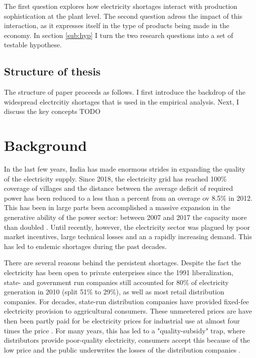 \documentclass[11pt]{article}
\begin{document}
The first question explores how electricity shortages interact with production sophistication at the plant level. The second question adress the impact of this interaction, as it expresses itself in the type of products being made in the economy. In section \ref{sub:hyp} I turn the two research questions into a set of testable hypothese.

\subsection{Structure of thesis}%
\label{sub:structure_of_thesis}
The structure of paper proceeds as follows. I first introduce the backdrop of the widespread electrcitiy shortages that is used in the empirical analysis. Next, I discuss the key concepts TODO 



\newpage
\section{Background}%
\label{sec:background}

In the last few years, India has made enormous strides in expanding the quality of the electricity supply. Since 2018, the electricity grid has reached 100\% coverage of villages and the distance between the average deficit of required power has been reduced to a less than a percent from an overage ov 8.5\% in 2012. This has been in large parts been accomplished a massive expansion in the generative ability of the power sector: between 2007 and 2017 the capacity more than doubled \citep{zhang_dark_2018}. Until recently, however, the electricity sector was plagued by poor market incentives, large technical losses and an a rapidly increasing demand. This has led to endemic shortages during the past decades.

There are several reasons behind the persistent shortages. Despite the fact the electricity has been open to private enterprises since the 1991 liberalization, state- and government run companies still accounted for 80\% of electricity generation in 2010 (split 51\% to 29\%), as well as most retail distribution companies. For decades, state-run distribution companies have provided fixed-fee electricity provision to aggricultural consumers. These unmeetered prices are have then been partly paid for be electricity prices for industrial use at almost four times the price \citep{allcott_how_2016}. For many years, this has led to a "quality-subsidy" trap, where distributors provide poor-quality electricity, consumers accept this because of the low price and the public underwrites the losses of the distribution companies \citep{mcrae_infrastructure_2015}. 
\end{document}
